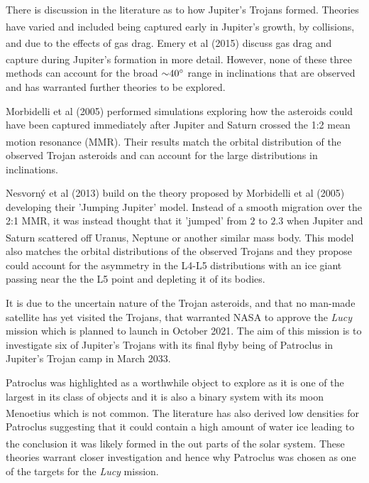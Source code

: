 \documentclass[10pt, twocolumn]{revtex4}    %
\newcommand{\scite}[1]{\textsuperscript{\cite{#1}}}
\begin{document}
There is discussion in the literature as to how Jupiter's Trojans formed. Theories have varied and included being captured early in Jupiter's growth,\scite{FlemingoriginTrojanasteroids2000} by collisions,\scite{ShoemakerTrojanasteroidsPopulations1989} and due to the effects of gas drag.\scite{KortenkampCaptureTrojanAsteroids2001} Emery et al (2015) discuss gas drag and capture during Jupiter's formation in more detail.\textsuperscript{\cite{EmeryComplexHistoryTrojan2015}} However, none  of these three methods can account for the broad ${\sim}40\degree$ range in inclinations that are observed and has warranted further theories to be explored.

Morbidelli et al (2005) performed simulations exploring how the asteroids could have been captured immediately after Jupiter and Saturn crossed the 1:2 mean motion resonance (MMR).\textsuperscript{\cite{MorbidelliChaoticcaptureJupiter2005a}} Their results match the orbital distribution of the observed Trojan asteroids and can account for the large distributions in inclinations.
 
Nesvorn\'y et al (2013) build on the theory proposed by Morbidelli et al (2005) developing their 'Jumping Jupiter' model. Instead of a smooth migration over the 2:1 MMR, it was instead thought that it 'jumped' from $2$ to $2.3$ when Jupiter and Saturn scattered off Uranus, Neptune or another similar mass body.\scite{NesvornyCaptureTrojansJumping2013} This model also matches the orbital distributions of the observed Trojans and they propose could account for the asymmetry in the L4-L5 distributions with an ice giant passing near the the L5 point and depleting it of its bodies.

It is due to the uncertain nature of the Trojan asteroids, and that no man-made satellite has yet visited the Trojans, that warranted NASA to approve the \textit{Lucy} mission which is planned to launch in October 2021. The aim of this mission is to investigate six of Jupiter's Trojans with its final flyby being of Patroclus in Jupiter's Trojan camp in March 2033. 

Patroclus was highlighted as a worthwhile object to explore as it is one of the largest in its class of objects and it is also a binary system with its moon Menoetius which is not common.\scite{BuieSIZESHAPESTELLAR2015} The literature has also derived low densities for Patroclus suggesting that it could contain a high amount of water ice leading to the conclusion it was likely formed in the out parts of the solar system.\scite{Marchislowdensity8gcm32006}\scite{YangSpectroscopicSearchWater2006} These theories warrant closer investigation and hence why Patroclus was chosen as one of the targets for the \textit{Lucy} mission.
\end{document}
